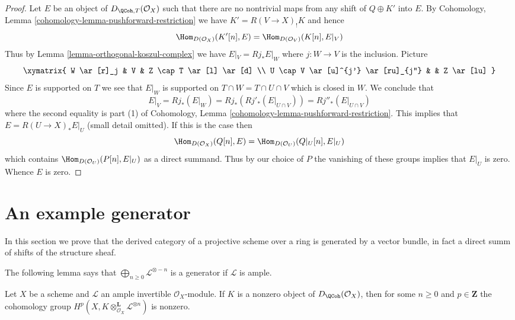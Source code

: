 \begin{proof}
\medskip\noindent
Let $E$ be an object of $D_{\QCoh, T}(\mathcal{O}_X)$ such that
there are no nontrivial maps from any shift of $Q \oplus K'$ into $E$.
By Cohomology, Lemma \ref{cohomology-lemma-pushforward-restriction}
we have $K' =  R(V \to X)_! K$ and hence
$$
\Hom_{D(\mathcal{O}_X)}(K'[n], E) = \Hom_{D(\mathcal{O}_V)}(K[n], E|_V)
$$
Thus by Lemma \ref{lemma-orthogonal-koszul-complex} we have
$E|_V = Rj_*E|_W$ where $j : W \to V$ is the inclusion. Picture
$$
\xymatrix{
W \ar[r]_j & V & Z \cap T \ar[l] \ar[d] \\
U \cap V \ar[u]^{j'} \ar[ru]_{j''} & & Z \ar[lu]
}
$$
Since $E$ is supported on $T$ we see that $E|_W$ is supported on
$T \cap W = T \cap U \cap V$ which is closed in $W$.
We conclude that
$$
E|_V = Rj_*(E|_W) = Rj_*(Rj'_*(E|_{U \cap V})) = Rj''_*(E|_{U \cap V})
$$
where the second equality is part (1) of
Cohomology, Lemma \ref{cohomology-lemma-pushforward-restriction}.
This implies that $E = R(U \to X)_*E|_U$ (small detail omitted). If
this is the case then
$$
\Hom_{D(\mathcal{O}_X)}(Q[n], E) = \Hom_{D(\mathcal{O}_U)}(Q|_U[n], E|_U)
$$
which contains $\Hom_{D(\mathcal{O}_U)}(P[n], E|_U)$ as a direct summand.
Thus by our choice of $P$ the vanishing of these groups implies that $E|_U$
is zero. Whence $E$ is zero.
\end{proof}



\section{An example generator}
\label{section-example-generator}

\noindent
In this section we prove that the derived category of a projective
scheme over a ring is generated by a vector bundle, in fact a direct
summ of shifts of the structure sheaf.

\medskip\noindent
The following lemma says that $\bigoplus_{n \geq 0} \mathcal{L}^{\otimes -n}$
is a generator if $\mathcal{L}$ is ample.

\begin{lemma}
\label{lemma-nonzero-some-cohomology}
Let $X$ be a scheme and $\mathcal{L}$ an ample invertible
$\mathcal{O}_X$-module. If $K$ is a nonzero object of
$D_\QCoh(\mathcal{O}_X)$, then for some $n \geq 0$ and $p \in \mathbf{Z}$
the cohomology group
$H^p(X, K \otimes_{\mathcal{O}_X}^\mathbf{L} \mathcal{L}^{\otimes n})$
is nonzero.
\end{lemma}

